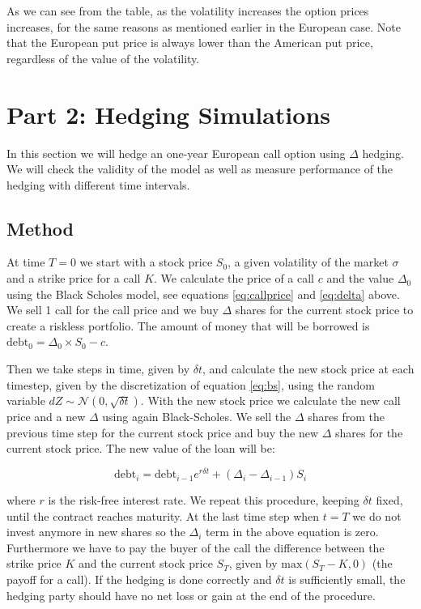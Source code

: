 \documentclass[11pt,a4paper]{article}
\begin{document}
As we can see from the table, as the volatility increases the option prices increases, for the same reasons as mentioned earlier in the European case. Note that the European put price is always lower than the American put price, regardless of the value of the volatility.

\section{Part 2: Hedging Simulations}

In this section we will hedge an one-year European call option using $\Delta$ hedging. We will check the validity of the model as well as measure performance of the hedging with different time intervals.

\subsection{Method}

At time $T = 0$ we start with a stock price $S_0$, a given volatility of the market $\sigma$ and a strike price for a call $K$. We calculate the price of a call $c$ and the value $\Delta_0$ using the Black Scholes model, see equations \ref{eq:callprice} and \ref{eq:delta} above. We sell 1 call for the call price and we buy $\Delta$ shares for the current stock price to create a riskless portfolio. The amount of money that will be borrowed is $\text{debt}_0 = \Delta_0 \times S_0 - c$.  

Then we take steps in time, given by $\delta t$, and calculate the new stock price at each timestep, given by the discretization of equation \ref{eq:bs}, using the random variable $dZ \sim \mathcal{N}(0,\sqrt{\delta t})$. With the new stock price we calculate the new call price and a new $\Delta$ using again Black-Scholes. We sell the $\Delta$ shares from the previous time step for the current stock price and buy the new $\Delta$ shares for the current stock price. The new value of the loan will be:

\begin{equation}
  \label{eq:loan}
  \text{debt}_{i} = \text{debt}_{i-1} e^{r\delta t} + (\Delta_{i} - \Delta_{i-1}) S_i
\end{equation}

where $r$ is the risk-free interest rate. We repeat this procedure, keeping $\delta t$ fixed, until the contract reaches maturity. At the last time step when $t = T$ we do not invest anymore in new shares so the $\Delta_i$ term in the above equation is zero. Furthermore we have to pay the buyer of the call the difference between the strike price $K$ and the current stock price $S_T$, given by $\text{max}(S_T - K,0)$ (the payoff for a call). If the hedging is done correctly and $\delta t$ is sufficiently small, the hedging party should have no net loss or gain at the end of the procedure. 
\end{document}
